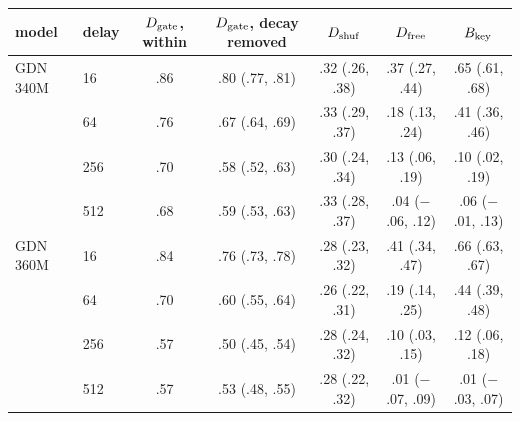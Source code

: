 \begin{tabular}{llccccc}
\toprule
model & delay & $D_{\rm gate}$, within & $D_{\rm gate}$, decay removed & $D_{\rm shuf}$ & $D_{\rm free}$ & $B_{\rm key}$ \\
\midrule
GDN 340M & 16 & .86 & .80 (.77, .81) & .32 (.26, .38) & .37 (.27, .44) & .65 (.61, .68) \\
 & 64 & .76 & .67 (.64, .69) & .33 (.29, .37) & .18 (.13, .24) & .41 (.36, .46) \\
 & 256 & .70 & .58 (.52, .63) & .30 (.24, .34) & .13 (.06, .19) & .10 (.02, .19) \\
 & 512 & .68 & .59 (.53, .63) & .33 (.28, .37) & .04 ($-$.06, .12) & .06 ($-$.01, .13) \\
\midrule
GDN 360M & 16 & .84 & .76 (.73, .78) & .28 (.23, .32) & .41 (.34, .47) & .66 (.63, .67) \\
 & 64 & .70 & .60 (.55, .64) & .26 (.22, .31) & .19 (.14, .25) & .44 (.39, .48) \\
 & 256 & .57 & .50 (.45, .54) & .28 (.24, .32) & .10 (.03, .15) & .12 (.06, .18) \\
 & 512 & .57 & .53 (.48, .55) & .28 (.22, .32) & .01 ($-$.07, .09) & .01 ($-$.03, .07) \\
\bottomrule
\end{tabular}
